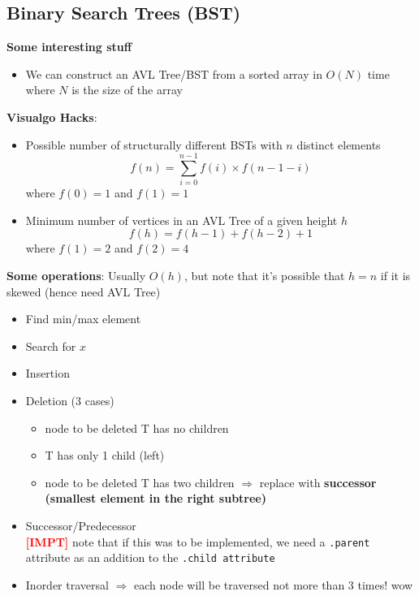 \documentclass{article}
\newcommand{\impt}[0]{\textcolor{red}{\textbf{[IMPT] }}}
\begin{document}
\begin{multicols}{2}
\subsection{Binary Search Trees (BST)}
\textbf{Some interesting stuff}
\begin{itemize}
	\item We can construct an AVL Tree/BST from a sorted array in $O(N)$ time where $N$ is the size of the array
\end{itemize}
\textbf{Visualgo Hacks}:
\begin{itemize}
	\item Possible number of structurally different BSTs with $n$ distinct elements
	$$f(n) = \sum_{i=0}^{n-1}f(i)\times f(n-1-i)$$
	where $f(0) = 1$ and $f(1)=1$
	\item Minimum number of vertices in an AVL Tree of a given height $h$
	$$f(h) = f(h-1) + f(h-2) + 1$$
	where $f(1) = 2$ and $f(2) = 4$
\end{itemize}
\textbf{Some operations}: Usually $O(h)$, but note that it's possible that $h=n$ if it is skewed (hence need AVL Tree)
\begin{itemize}
	\item Find min/max element
	\item Search for $x$
	\item Insertion
	\item Deletion (3 cases)
	\begin{itemize}
		\item node to be deleted T has no children
		\item T has only 1 child (left)
		\item node to be deleted T has two children $\Rightarrow$ replace with \textbf{successor (smallest element in the right subtree)}
	\end{itemize}
    \item Successor/Predecessor\\
    \impt note that if this was to be implemented, we need a \texttt{.parent} attribute as an addition to the \texttt{.child attribute}
    \item Inorder traversal $\Rightarrow$ each node will be traversed not more than 3 times! wow
\end{itemize}


\end{multicols}
\end{document}
